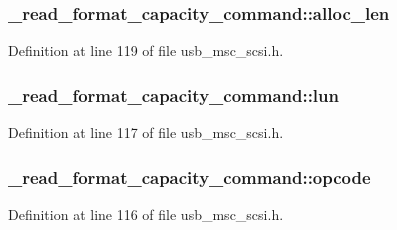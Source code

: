 \subsubsection[{\texorpdfstring{alloc\+\_\+len}{alloc_len}}]{ \+\_\+read\+\_\+format\+\_\+capacity\+\_\+command\+::alloc\+\_\+len}\hypertarget{struct__read__format__capacity__command_a5fcf0fe443ebd2f09d10c61ba98b144c}{}\label{struct__read__format__capacity__command_a5fcf0fe443ebd2f09d10c61ba98b144c}


Definition at line 119 of file usb\+\_\+msc\+\_\+scsi.\+h.

\subsubsection[{\texorpdfstring{lun}{lun}}]{ \+\_\+read\+\_\+format\+\_\+capacity\+\_\+command\+::lun}\hypertarget{struct__read__format__capacity__command_ac04ecd062a0b3305716adae9b8150600}{}\label{struct__read__format__capacity__command_ac04ecd062a0b3305716adae9b8150600}


Definition at line 117 of file usb\+\_\+msc\+\_\+scsi.\+h.

\subsubsection[{\texorpdfstring{opcode}{opcode}}]{ \+\_\+read\+\_\+format\+\_\+capacity\+\_\+command\+::opcode}\hypertarget{struct__read__format__capacity__command_a94a373bdad8b7f07d7a43419efb3e9cc}{}\label{struct__read__format__capacity__command_a94a373bdad8b7f07d7a43419efb3e9cc}


Definition at line 116 of file usb\+\_\+msc\+\_\+scsi.\+h.

